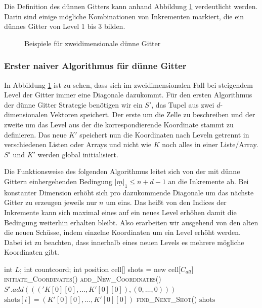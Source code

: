 \documentclass[a4paper,12pt]{llncs}
\numberwithin{equation}{section}
\begin{document}
Die Definition des dünnen Gitters kann anhand Abbildung \ref{fig:gitter03} verdeutlicht werden. Darin sind einige mögliche Kombinationen von Inkrementen markiert, die ein dünnes Gitter von Level 1 bis 3 bilden.

\begin{figure}
	\caption{Beispiele für zweidimensionale dünne Gitter}
	\label{fig:gitter03}
\end{figure}

\subsubsection{Erster naiver Algorithmus für dünne Gitter}

In Abbildung \ref{fig:gitter03} ist zu sehen, dass sich im zweidimensionalen Fall bei steigendem Level der Gitter immer eine Diagonale dazukommt. Für den ersten Algorithmus der dünne Gitter Strategie benötigen wir ein $S'$, das Tupel aus zwei $d$-dimensionalen Vektoren speichert. Der erste um die Zelle zu beschreiben und der zweite um das Level aus der die korrespondierende Koordinate stammt zu definieren. Das neue $K'$ speichert nun die Koordinaten nach Leveln getrennt in verschiedenen Listen oder Arrays und nicht wie $K$ noch alles in einer Liste/Array. $S'$ und $K'$ werden global initialisiert.

Die Funktionsweise des folgenden Algorithmus leitet sich von der mit dünne Gittern einhergehenden Bedingung $|\underline{m}|_1\leq n+d-1$ an die Inkremente ab. Bei konstanter Dimension erhöht sich pro dazukommende Diagonale um das nächste Gitter zu erzeugen jeweils nur $n$ um eins. Das heißt von den Indices der Inkremente kann sich maximal eines auf ein neues Level erhöhen damit die Bedingung weiterhin erhalten bleibt. Also erarbeiten wir ausgehend von den alten die neuen Schüsse, indem einzelne Koordinaten um ein Level erhöht werden. Dabei ist zu beachten, dass innerhalb eines neuen Levels es mehrere mögliche Koordinaten gibt. 


\begin{tcolorbox}
	\begin{algorithmic}
		\State int $L$; int countcoord; int position
		\State cell[] shots = new cell[$C_{all}$]
		\State \textsc{initiate\_Coordinates}()
		\EndIf
		\State \textsc{add\_New\_Coordinates}()
		\EndIf
		\State $S'.add((('K[0][0],\dots,K'[0][0]),(0,\dots,0)))$
		\State $\text{shots}[i] = (K'[0][0],\dots,K'[0][0])$
		\Else
		\State \textsc{find\_Next\_Shot}()
		\EndIf
		\EndFor
		\State \Return $\text{shots}$
		\EndFunction
	\end{algorithmic}
\end{tcolorbox}
\end{document}

